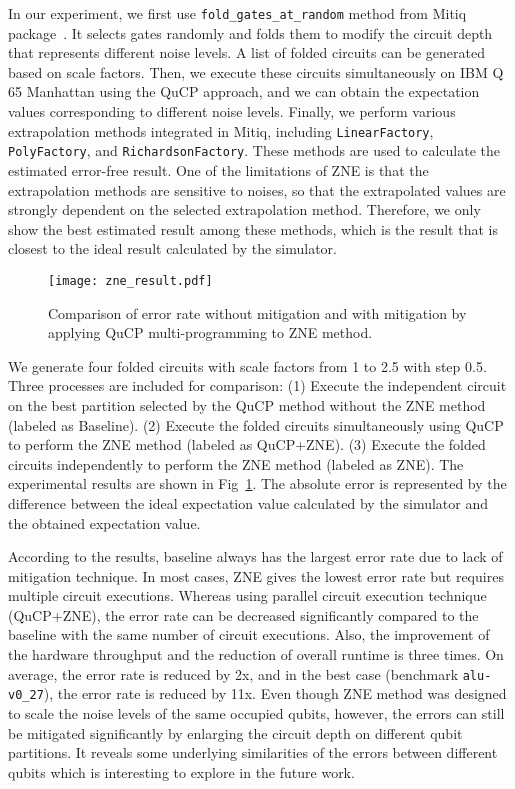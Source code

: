 \documentclass[conference]{IEEEtran}
\begin{document}
In our experiment, we first use \texttt{fold\_gates\_at\_random} method from Mitiq package~\cite{larose2020mitiq}. It selects gates randomly and folds them to modify the circuit depth that represents different noise levels. A list of folded circuits can be generated based on scale factors. Then, we execute these circuits simultaneously on IBM Q 65 Manhattan using the QuCP approach, and we can obtain the expectation values corresponding to different noise levels. Finally, we perform various extrapolation methods integrated in Mitiq, including \texttt{LinearFactory}, \texttt{PolyFactory}, and \texttt{RichardsonFactory}. These methods are used to calculate the estimated error-free result. One of the limitations of ZNE is that the extrapolation methods are sensitive to noises, so that the extrapolated values are strongly dependent on the selected extrapolation method. Therefore, we only show the best estimated result among these methods, which is the result that is closest to the ideal result calculated by the simulator. 

\begin{figure}[t]
\centering
\texttt{[image: zne\_result.pdf]}
\caption{Comparison of error rate without mitigation and with mitigation by applying QuCP multi-programming to ZNE method.}
\label{fig:zne_result}
\end{figure}

We generate four folded circuits with scale factors from 1 to 2.5 with step 0.5. Three processes are included for comparison: (1) Execute the independent circuit on the best partition selected by the QuCP method without the ZNE method (labeled as Baseline). (2) Execute the folded circuits simultaneously using QuCP to perform the ZNE method (labeled as QuCP+ZNE). (3) Execute the folded circuits independently to perform the ZNE method (labeled as ZNE). The experimental results are shown in Fig~\ref{fig:zne_result}. The absolute error is represented by the difference between the ideal expectation value calculated by the simulator and the obtained expectation value. 

According to the results, baseline always has the largest error rate due to lack of mitigation technique. In most cases, ZNE gives the lowest error rate but requires multiple circuit executions. Whereas using parallel circuit execution technique (QuCP+ZNE), the error rate can be decreased significantly compared to the baseline with the same number of circuit executions. Also, the improvement of the hardware throughput and the reduction of overall runtime is three times. On average, the error rate is reduced by 2x, and in the best case (benchmark \texttt{alu-v0\_27}), the error rate is reduced by 11x. Even though ZNE method was designed to scale the noise levels of the same occupied qubits, however, the errors can still be mitigated significantly by enlarging the circuit depth on different qubit partitions. It reveals some underlying similarities of the errors between different qubits which is interesting to explore in the future work. 
\end{document}
